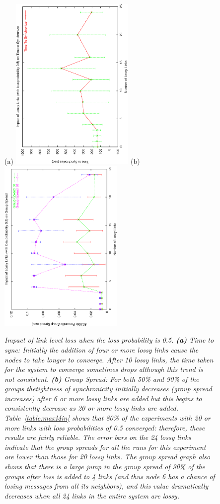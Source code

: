 \begin{figure}
\centerline{%
(a)
\includegraphics[width=6cm,angle=270]{figures/TTSvsLossyLinks0.5.ps}
(b)
\includegraphics[width=6cm,angle=270]{figures/GSvsLossyLinks0.5.ps}
}
\caption{ {\it Impact of link level loss when the loss probability is 0.5. {\bf (a)} Time to sync: Initially the addition of four or more lossy links cause the nodes to take longer to converge.  After 10 lossy links, the time taken for the system to converge sometimes drops although this trend is not consistent.  {\bf (b)} Group Spread: For both 50\% and 90\% of the groups thetightness of synchronicity initially decreases (group spread increases) after 6 or more lossy links are added but this begins to consistently decrease as 20 or more lossy links are added. Table~\ref{table:maxMin} shows that 80\% of the experiments with 20 or more links with loss probabilities of 0.5 converged: therefore, these results are fairly reliable. The error bars on the 24 lossy links indicate that the group spreads for all the runs for this experiment are lower than those for 20 lossy links.  The group spread graph also shows that there is a large jump in the group spread of 90\% of the groups after loss is added to 4 links (and thus node 6 has a chance of losing messages from all its neighbors), and this value dramatically decreases when all 24 links in the entire system are lossy.}}
\label{fig:linkloss0.5}
\end{figure}

